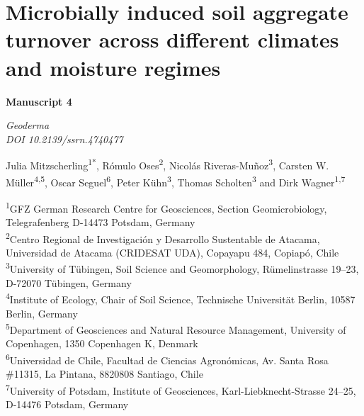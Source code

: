 \chapter{Microbially induced soil aggregate turnover across different climates and moisture regimes}
\label{chap:manuscript4} %

\begin{center}
    \textbf{\Large Manuscript 4}
  
    \vspace{0.3cm}
    \textit{Geoderma}\\
    \textit{DOI 10.2139/ssrn.4740477}
    
    \vspace{0.5cm}

    Julia Mitzscherling\textsuperscript{1*}, Rómulo Oses\textsuperscript{2}, Nicolás Riveras-Muñoz\textsuperscript{3}, Carsten W. Müller\textsuperscript{4,5}, Oscar Seguel\textsuperscript{6},   Peter Kühn\textsuperscript{3}, Thomas Scholten\textsuperscript{3} and Dirk Wagner\textsuperscript{1,7}

    \vspace{0.2cm}
  \end{center}
  
  \begin{scriptsize}
    \begin{justify}
        
      \textsuperscript{1}GFZ German Research Centre for Geosciences, Section Geomicrobiology, Telegrafenberg D-14473 Potsdam, Germany\\
      \textsuperscript{2}Centro Regional de Investigaci{\'o}n y Desarrollo Sustentable de Atacama, Universidad de Atacama (CRIDESAT UDA), Copayapu 484, Copiap{\'o}, Chile\\
      \textsuperscript{3}University of T{\"u}bingen, Soil Science and Geomorphology, R{\"u}melinstrasse 19--23, D-72070 T{\"u}bingen, Germany\\
      \textsuperscript{4}Institute of Ecology, Chair of Soil Science, Technische Universit{\"a}t Berlin, 10587 Berlin, Germany\\
      \textsuperscript{5}Department of Geosciences and Natural Resource Management, University of Copenhagen, 1350 Copenhagen K, Denmark\\
      \textsuperscript{6}Universidad de Chile, Facultad de Ciencias Agron{\'o}micas, Av. Santa Rosa \#11315, La Pintana, 8820808 Santiago, Chile\\
      \textsuperscript{7}University of Potsdam, Institute of Geosciences, Karl-Liebknecht-Strasse 24--25, D-14476 Potsdam, Germany

    \end{justify}
  \end{scriptsize}
    
